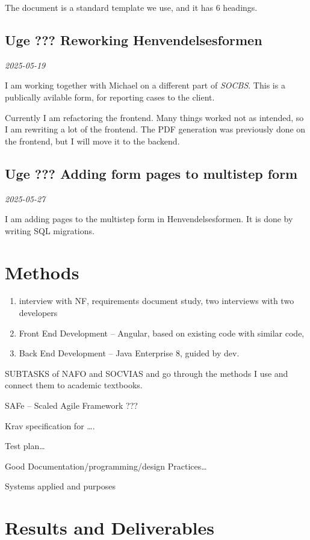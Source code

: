 \documentclass[../main.tex]{subfiles}
\begin{document}
The document is a standard template we use, and it has 6 headings.

\subsection{Uge ??? \textbf{Reworking Henvendelsesformen}}

\textit{2025-05-19}

I am working together with Michael on a different part of \textit{SOCBS}. This is a publically avilable form, for reporting cases to the client. 

Currently I am refactoring the frontend. Many things worked not as intended, so I am rewriting a lot of the frontend. The PDF generation was previously done on the frontend, but I will move it to the backend.

\subsection{Uge ??? \textbf{Adding form pages to multistep form}}

\textit{2025-05-27}

I am adding pages to the multistep form in Henvendelsesformen. It is done by writing SQL migrations. 

\section{Methods}

\begin{enumerate}
\item interview with NF, requirements document study, two interviews with two developers 
\item Front End Development – Angular, based on existing code with similar code,  
\item Back End Development – Java Enterprise 8, guided by dev. 
\end{enumerate}

SUBTASKS of NAFO and SOCVIAS and go through the methods I use and connect them to academic textbooks.  

SAFe – Scaled Agile Framework ??? 

Krav specification for …. 

Test plan… 

Good Documentation/programming/design Practices… 

Systems applied and purposes 


\section{Results and Deliverables}
\end{document}
